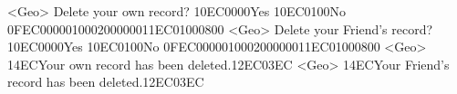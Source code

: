 <Geo> Delete your own record? {10}{EC}{00}{00}Yes {10}{EC}{01}{00}No {0F}{EC}{00}{00}{01}{00}{02}{00}{00}{00}{11}{EC}{01}{00}{08}{00}
<Geo> Delete your Friend's record? {10}{EC}{00}{00}Yes {10}{EC}{01}{00}No {0F}{EC}{00}{00}{01}{00}{02}{00}{00}{00}{11}{EC}{01}{00}{08}{00}
<Geo> {14}{EC}Your own record has been deleted.{12}{EC}{03}{EC}
<Geo> {14}{EC}Your Friend's record has been deleted.{12}{EC}{03}{EC}

